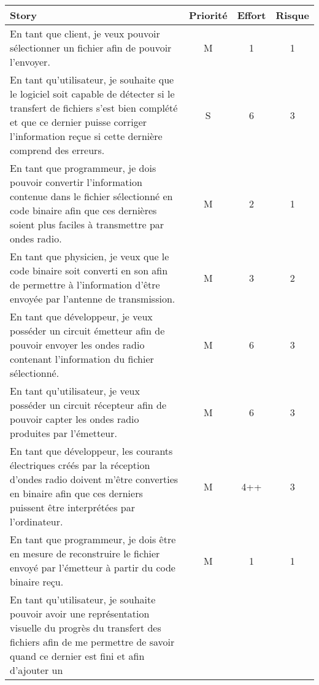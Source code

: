 \begin{table}[ht]
\centering
    \begin{tabular}{|p{10cm}|c|c|c|}
    \hline
        \rowcolor{Gray}
        Story & Priorité & Effort & Risque \\
    \hline
          En tant que client,
          je veux pouvoir sélectionner un fichier
          afin de pouvoir l'envoyer.
        & M & 1 & 1 \\
    \hline
          En tant qu'utilisateur,
          je souhaite que le logiciel soit capable de détecter
          si le transfert de fichiers s'est bien complété et que
          ce dernier puisse corriger l'information reçue si cette
          dernière comprend des erreurs.
        & S & 6 & 3 \\
    \hline
          En tant que programmeur,
          je dois pouvoir convertir l'information contenue 
          dans le fichier sélectionné en code binaire afin que ces 
          dernières soient plus faciles à transmettre par ondes radio.
        & M & 2 & 1 \\
     \hline
          En tant que physicien,
          je veux que le code binaire soit converti en son afin de permettre à l'information d'être envoyée par l'antenne de transmission.
        & M & 3 & 2 \\    
     \hline
          En tant que développeur,
          je veux posséder un circuit émetteur afin de pouvoir envoyer les ondes radio contenant l'information du fichier sélectionné.
        & M & 6 & 3 \\
    \hline
          En tant qu'utilisateur,
          je veux posséder un circuit récepteur afin de pouvoir capter les ondes radio produites par l'émetteur.
        & M & 6 & 3 \\
    \hline
          En tant que développeur,
          les courants électriques créés par la réception d'ondes radio doivent 
          m'être converties en binaire afin que ces derniers puissent être interprétées 
          par l'ordinateur.
        & M & 4++ & 3 \\
    \hline
          En tant que programmeur,
          je dois être en mesure de reconstruire le fichier envoyé par l'émetteur à partir du code binaire reçu.
        & M & 1 & 1 \\
    \hline
          En tant qu'utilisateur,
          je souhaite pouvoir avoir une représentation visuelle
          du progrès du transfert des fichiers afin de me permettre
          de savoir quand ce dernier est fini et afin d'ajouter un

\end{tabular}
\end{table}
